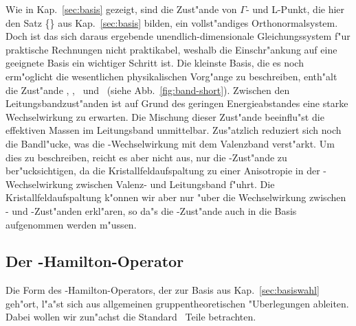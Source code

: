 Wie in Kap.~\ref{sec:basis} gezeigt, sind die Zust"ande von $\Gamma$- und
L-Punkt, die hier den Satz \{\set\} aus Kap.~\ref{sec:basis} bilden,
ein vollst"andiges Orthonormalsystem. Doch ist das sich daraus ergebende
unendlich-dimensionale Gleichungssystem f"ur praktische Rechnungen nicht
praktikabel, weshalb die Einschr"ankung auf eine geeignete Basis ein wichtiger
Schritt ist. Die kleinste Basis, die es noch erm"oglicht die
wesentlichen physikalischen Vorg"ange zu beschreiben, enth"alt die Zust"ande
\GCB, \GVB, \LCB\ und \LVB\ (siehe Abb.~\ref{fig:band-short}). Zwischen den
Leitungsbandzust"anden ist auf Grund des geringen Energieabstandes eine starke
Wechselwirkung zu erwarten. Die Mischung dieser Zust"ande beeinflu"st die
effektiven Massen im Leitungsband unmittelbar. Zus"atzlich reduziert sich noch
die Bandl"ucke, was die \kdotp-Wechselwirkung mit dem Valenzband verst"arkt.
Um dies zu beschreiben, reicht es aber nicht aus, nur die \GVB-Zust"ande zu
ber"ucksichtigen, da die Kristallfeldaufspaltung zu einer Anisotropie in der
\kdotp-Wechselwirkung zwischen Valenz- und Leitungsband f"uhrt. Die
Kristallfeldaufspaltung k"onnen wir aber nur "uber die Wechselwirkung zwischen
\GVB- und \LVB-Zust"anden erkl"aren, so da"s die \LVB-Zust"ande auch in die
Basis aufgenommen werden m"ussen.



\subsection{Der \kdotp-Hamilton-Operator}
\label{sec:k.p-H}

Die Form des \kdotp-Hamilton-Operators, der zur Basis aus
Kap.~\ref{sec:basiswahl} geh"ort, l"a"st sich aus allgemeinen
gruppentheoretischen "Uberlegungen ableiten. Dabei wollen wir zun"achst die
Standard \kdotp\ Teile betrachten.


